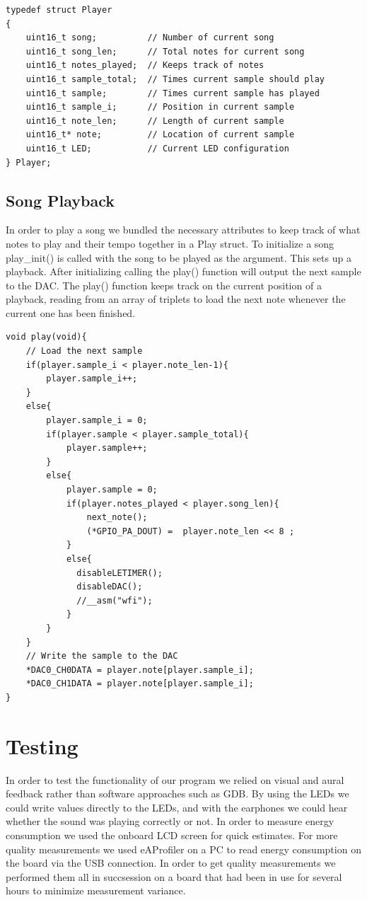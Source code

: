 \begin{minipage}{\textwidth}
\begin{lstlisting}
typedef struct Player
{
	uint16_t song;			// Number of current song
	uint16_t song_len;		// Total notes for current song
	uint16_t notes_played;	// Keeps track of notes
	uint16_t sample_total;	// Times current sample should play	
	uint16_t sample;		// Times current sample has played
	uint16_t sample_i;		// Position in current sample 
	uint16_t note_len;		// Length of current sample
	uint16_t* note;			// Location of current sample
	uint16_t LED;			// Current LED configuration
} Player;
\end{lstlisting}
\end{minipage}

\subsection{Song Playback}
In order to play a song we bundled the necessary attributes to keep track of what notes to play and their tempo together in a Play struct. To initialize a song play\_init() is called with the song to be played as the argument. This sets up a playback. After initializing calling the play() function will output the next sample to the DAC.
The play() function keeps track on the current position of a playback, reading from an array of triplets to load the next note whenever the current one has been finished. \\

\begin{minipage}{\textwidth}
\begin{lstlisting}
void play(void){
	// Load the next sample
	if(player.sample_i < player.note_len-1){			
		player.sample_i++;								
	}
	else{								
		player.sample_i = 0;
		if(player.sample < player.sample_total){
   			player.sample++;				
		}
		else{							
			player.sample = 0;
			if(player.notes_played < player.song_len){
				next_note();
				(*GPIO_PA_DOUT) =  player.note_len << 8 ;		
			}			 
			else{
			  disableLETIMER();
			  disableDAC();
			  //__asm("wfi");
			}
		}
	}
	// Write the sample to the DAC
	*DAC0_CH0DATA = player.note[player.sample_i];
	*DAC0_CH1DATA = player.note[player.sample_i];
}
\end{lstlisting}
\end{minipage}



\section{Testing}
In order to test the functionality of our program we relied on visual and aural feedback rather than software approaches such as GDB. By using the LEDs we could write values directly to the LEDs, and with the earphones we could hear whether the sound was playing correctly or not. In order to measure energy consumption we used the onboard LCD screen for quick estimates. For more quality measurements we used eAProfiler on a PC to read energy consumption on the board via the USB connection. In order to get quality measurements we performed them all in succsession on a board that had been in use for several hours to minimize measurement variance. 

